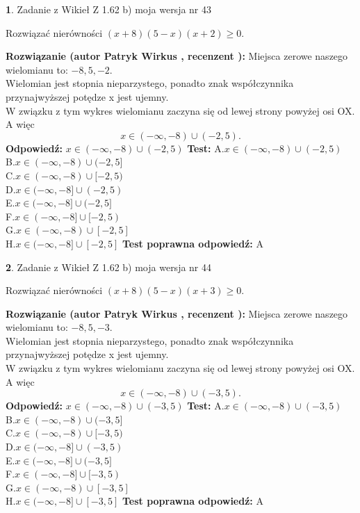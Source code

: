 \documentclass[12pt, a4paper]{article}
\theoremstyle{definition} %
\newtheorem{zad}{}
\newcommand{\zadStart}[1]{\begin{zad}#1\newline}
\newcommand{\zadStop}{\end{zad}}
\newcommand{\rozwStart}[2]{\noindent \textbf{Rozwiązanie (autor #1 , recenzent #2): }\newline}
\newcommand{\rozwStop}{\newline}
\newcommand{\odpStart}{\noindent \textbf{Odpowiedź:}\newline}
\newcommand{\odpStop}{\newline}
\newcommand{\testStart}{\noindent \textbf{Test:}\newline}
\newcommand{\testStop}{\newline}
\newcommand{\kluczStart}{\noindent \textbf{Test poprawna odpowiedź:}\newline}
\newcommand{\kluczStop}{\newline}
\begin{document}
\zadStart{Zadanie z Wikieł Z 1.62 b) moja wersja nr 43}

Rozwiązać nierówności $(x+8)(5-x)(x+2)\ge0$.
\zadStop
\rozwStart{Patryk Wirkus}{}
Miejsca zerowe naszego wielomianu to: $-8, 5, -2$.\\
Wielomian jest stopnia nieparzystego, ponadto znak współczynnika przy\linebreak najwyższej potędze x jest ujemny.\\ W związku z tym wykres wielomianu zaczyna się od lewej strony powyżej osi OX. A więc $$x \in (-\infty,-8) \cup (-2,5).$$
\rozwStop
\odpStart
$x \in (-\infty,-8) \cup (-2,5)$
\odpStop
\testStart
A.$x \in (-\infty,-8) \cup (-2,5)$\\
B.$x \in (-\infty,-8) \cup (-2,5]$\\
C.$x \in (-\infty,-8) \cup [-2,5)$\\
D.$x \in (-\infty,-8] \cup (-2,5)$\\
E.$x \in (-\infty,-8] \cup (-2,5]$\\
F.$x \in (-\infty,-8] \cup [-2,5)$\\
G.$x \in (-\infty,-8) \cup [-2,5]$\\
H.$x \in (-\infty,-8] \cup [-2,5]$
\testStop
\kluczStart
A
\kluczStop



\zadStart{Zadanie z Wikieł Z 1.62 b) moja wersja nr 44}

Rozwiązać nierówności $(x+8)(5-x)(x+3)\ge0$.
\zadStop
\rozwStart{Patryk Wirkus}{}
Miejsca zerowe naszego wielomianu to: $-8, 5, -3$.\\
Wielomian jest stopnia nieparzystego, ponadto znak współczynnika przy\linebreak najwyższej potędze x jest ujemny.\\ W związku z tym wykres wielomianu zaczyna się od lewej strony powyżej osi OX. A więc $$x \in (-\infty,-8) \cup (-3,5).$$
\rozwStop
\odpStart
$x \in (-\infty,-8) \cup (-3,5)$
\odpStop
\testStart
A.$x \in (-\infty,-8) \cup (-3,5)$\\
B.$x \in (-\infty,-8) \cup (-3,5]$\\
C.$x \in (-\infty,-8) \cup [-3,5)$\\
D.$x \in (-\infty,-8] \cup (-3,5)$\\
E.$x \in (-\infty,-8] \cup (-3,5]$\\
F.$x \in (-\infty,-8] \cup [-3,5)$\\
G.$x \in (-\infty,-8) \cup [-3,5]$\\
H.$x \in (-\infty,-8] \cup [-3,5]$
\testStop
\kluczStart
A
\kluczStop
\end{document}
